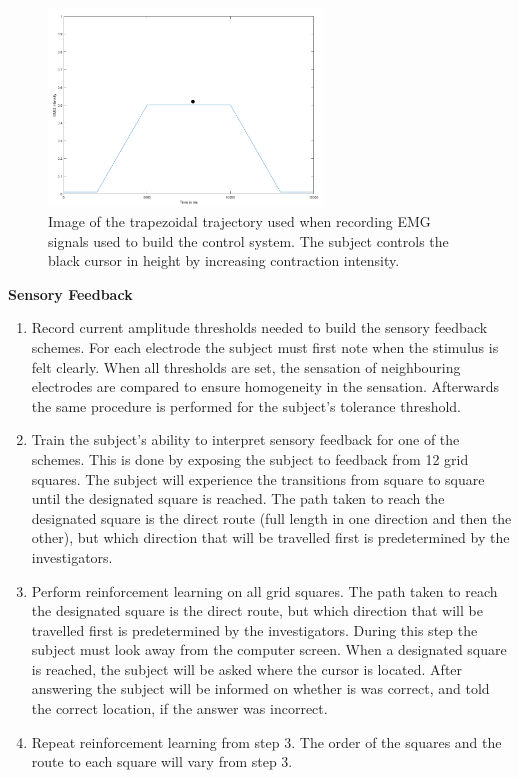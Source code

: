 \begin{figure}[H]                 
	\includegraphics[width=0.65\textwidth]{figures/trapezoid2}  
	\caption{Image of the trapezoidal trajectory used when recording EMG signals used to build the control system. The subject controls the black cursor in height by increasing contraction intensity.}
	\label{fig:trapezoid} 
\end{figure}

\textbf{Sensory Feedback} \\
\vspace{-25pt}
\begin{enumerate}
	\item Record current amplitude thresholds needed to build the sensory feedback schemes. For each electrode the subject must first note when the stimulus is felt clearly. When all thresholds are set, the sensation of neighbouring electrodes are compared to ensure homogeneity in the sensation. Afterwards the same procedure is performed for the subject's tolerance threshold. 
	\item Train the subject's ability to interpret sensory feedback for one of the schemes. This is done by exposing the subject to feedback from 12 grid squares. The subject will experience the transitions from square to square until the designated square is reached. The path taken to reach the designated square is the direct route (full length in one direction and then the other), but which direction that will be travelled first is predetermined by the investigators.
	\item Perform reinforcement learning on all grid squares. The path taken to reach the designated square is the direct route, but which direction that will be travelled first is predetermined by the investigators. During this step the subject must look away from the computer screen. When a designated square is reached, the subject will be asked where the cursor is located. After answering the subject will be informed on whether is was correct, and told the correct location, if the answer was incorrect. 
	\item Repeat reinforcement learning from step 3. The order of the squares and the route to each square will vary from step 3.
\end{enumerate}

